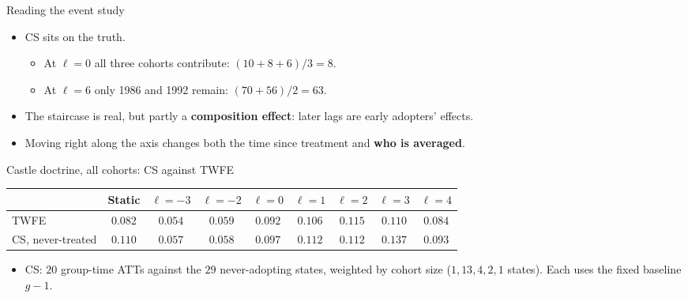 \documentclass[
  11pt,
  ignorenonframetext,
  aspectratio=169,
]{beamer}
\providecommand{\tightlist}{%
  \setlength{\itemsep}{0pt}\setlength{\parskip}{0pt}}
\begin{document}
\begin{frame}{Reading the event study}
\protect{}\label{reading-the-event-study}
\begin{itemize}
\tightlist
\item
  CS sits on the truth.

  \begin{itemize}
  \tightlist
  \item
    At \(\ell = 0\) all three cohorts contribute:
    \((10 + 8 + 6)/3 = 8\).
  \item
    At \(\ell = 6\) only 1986 and 1992 remain: \((70 + 56)/2 = 63\).
  \end{itemize}
\item
  The staircase is real, but partly a \textbf{composition effect}: later
  lags are early adopters' effects.
\item
  Moving right along the axis changes both the time since treatment and
  \textbf{who is averaged}.
\end{itemize}
\end{frame}

\begin{frame}{Castle doctrine, all cohorts: CS against TWFE}
\protect{}\label{castle-doctrine-all-cohorts-cs-against-twfe}
\begin{center}\small
\begin{tabular}{lcccccccc}
\toprule
 & Static & $\ell=-3$ & $\ell=-2$ & $\ell=0$ & $\ell=1$ & $\ell=2$ & $\ell=3$ & $\ell=4$ \\
\midrule
TWFE & $0.082$ & $0.054$ & $0.059$ & $0.092$ & $0.106$ & $0.115$ & $0.110$ & $0.084$ \\
CS, never-treated & $0.110$ & $0.057$ & $0.058$ & $0.097$ & $0.112$ & $0.112$ & $0.137$ & $0.093$ \\
\bottomrule
\end{tabular}
\end{center}

\begin{itemize}
\tightlist
\item
  CS: \(20\) group-time ATTs against the \(29\) never-adopting states,
  weighted by cohort size (\(1, 13, 4, 2, 1\) states). Each uses the
  fixed baseline \(g-1\).
\end{itemize}
\end{frame}
\end{document}
